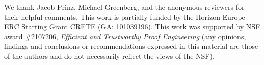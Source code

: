 \documentclass[sigplan,screen]{acmart}
\begin{document}


\maketitle











\begin{acks}
  We thank Jacob Prinz, Michael Greenberg, and the anonymous reviewers
  for their helpful comments.  This work is partially funded by the
  Horizon Europe ERC Starting Grant CRETE (GA: 101039196). This work
  was supported by NSF award \#2107206, {\em Efficient and Trustworthy
    Proof Engineering} (any opinions, findings and conclusions or
  recommendations expressed in this material are those of the authors
  and do not necessarily reflect the views of the NSF).
\end{acks}





\end{document}
